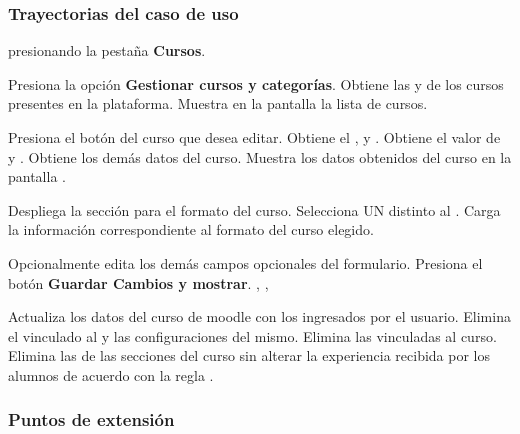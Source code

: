 \clearpage
\subsubsection{Trayectorias del caso de uso}

\begin{UCtrayectoria}%
%
  presionando la pestaña {\bf Cursos}.

  \Actor Presiona la opción {\bf Gestionar cursos y categorías}.
  \Sistema Obtiene las  y 
            de los cursos presentes en la plataforma.
  \Sistema Muestra en la pantalla  la lista de cursos.
           \label{CU-E05-course-list}

  \Actor Presiona el botón \IUConfigurar del curso que desea editar.
  \Sistema Obtiene el ,  y
           .
  \Sistema Obtiene el valor de  y
           . 
  \Sistema Obtiene los demás datos del curso.
  \Sistema Muestra los datos obtenidos del curso en la pantalla .

  \Actor Despliega la sección para el formato del curso.
  \Actor Selecciona UN  distinto al .
  \Sistema Carga la información correspondiente al formato del curso elegido.

  \Actor Opcionalmente edita los demás campos opcionales del formulario.
  \Actor Presiona el botón {\bf Guardar Cambios y mostrar}. , ,
          \label{CU-E05-submit}

  \Sistema Actualiza los datos del curso de moodle con los ingresados por el usuario.
  \Sistema Elimina el  vinculado al  y las
           configuraciones del mismo.
  \Sistema Elimina las  vinculadas al curso.
  \Sistema Elimina las  de las secciones del curso
           sin alterar la experiencia recibida por los alumnos de acuerdo con la regla
           .

\end{UCtrayectoria}


\subsubsection{Puntos de extensión}


